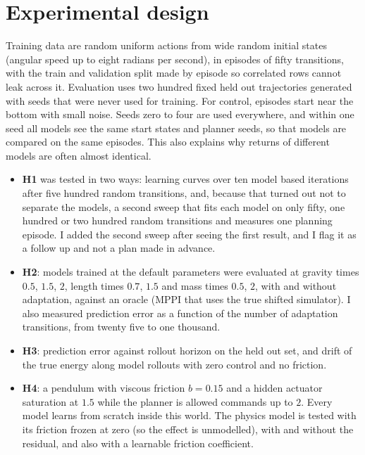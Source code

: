 \documentclass[11pt,a4paper]{article}
\begin{document}
\section{Experimental design}
Training data are random uniform actions from wide random initial states (angular speed up to eight radians per second), in episodes of fifty transitions, with the train and validation split made by episode so correlated rows cannot leak across it. Evaluation uses two hundred fixed held out trajectories generated with seeds that were never used for training. For control, episodes start near the bottom with small noise. Seeds zero to four are used everywhere, and within one seed all models see the same start states and planner seeds, so that models are compared on the same episodes. This also explains why returns of different models are often almost identical.

\begin{itemize}[leftmargin=1.5em]
\item \textbf{H1} was tested in two ways: learning curves over ten model based iterations after five hundred random transitions, and, because that turned out not to separate the models, a second sweep that fits each model on only fifty, one hundred or two hundred random transitions and measures one planning episode. I added the second sweep after seeing the first result, and I flag it as a follow up and not a plan made in advance.
\item \textbf{H2}: models trained at the default parameters were evaluated at gravity times $0.5$, $1.5$, $2$, length times $0.7$, $1.5$ and mass times $0.5$, $2$, with and without adaptation, against an oracle (MPPI that uses the true shifted simulator). I also measured prediction error as a function of the number of adaptation transitions, from twenty five to one thousand.
\item \textbf{H3}: prediction error against rollout horizon on the held out set, and drift of the true energy along model rollouts with zero control and no friction.
\item \textbf{H4}: a pendulum with viscous friction $b=0.15$ and a hidden actuator saturation at $1.5$ while the planner is allowed commands up to $2$. Every model learns from scratch inside this world. The physics model is tested with its friction frozen at zero (so the effect is unmodelled), with and without the residual, and also with a learnable friction coefficient.
\end{itemize}
\end{document}
